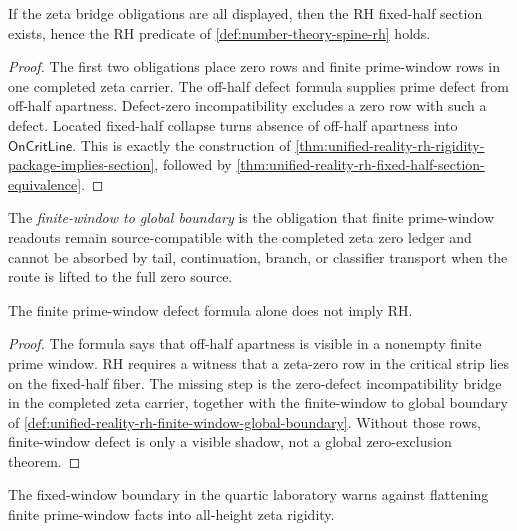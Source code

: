 \begin{theorem}
\label{thm:unified-reality-rh-zeta-bridge-obligations-close-section}
If the zeta bridge obligations are all displayed, then the RH
fixed-half section exists, hence the RH predicate of
\autoref{def:number-theory-spine-rh} holds.
\end{theorem}

\begin{proof}
The first two obligations place zero rows and finite prime-window rows in
one completed zeta carrier. The off-half defect formula supplies prime
defect from off-half apartness. Defect-zero incompatibility excludes a
zero row with such a defect. Located fixed-half collapse turns absence of
off-half apartness into $\mathsf{OnCritLine}$. This is exactly the
construction of
\autoref{thm:unified-reality-rh-rigidity-package-implies-section},
followed by
\autoref{thm:unified-reality-rh-fixed-half-section-equivalence}.
\end{proof}

\begin{definition}
\label{def:unified-reality-rh-finite-window-global-boundary}
The \emph{finite-window to global boundary} is the obligation that
finite prime-window readouts remain source-compatible with the completed
zeta zero ledger and cannot be absorbed by tail, continuation, branch,
or classifier transport when the route is lifted to the full zero source.
\end{definition}

\begin{theorem}
\label{thm:unified-reality-rh-finite-window-facts-not-rh}
The finite prime-window defect formula alone does not imply RH.
\end{theorem}

\begin{proof}
The formula says that off-half apartness is visible in a nonempty finite
prime window. RH requires a witness that a zeta-zero row in the critical
strip lies on the fixed-half fiber. The missing step is the
zero-defect incompatibility bridge in the completed zeta carrier,
together with the finite-window to global boundary of
\autoref{def:unified-reality-rh-finite-window-global-boundary}. Without
those rows, finite-window defect is only a visible shadow, not a global
zero-exclusion theorem.
\end{proof}

\begin{corollary}
\label{cor:unified-reality-rh-fixed-window-discipline-warning}
The fixed-window boundary in the quartic laboratory warns against
flattening finite prime-window facts into all-height zeta rigidity.
\end{corollary}

